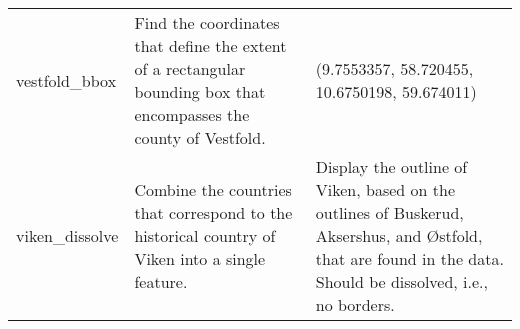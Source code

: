 \begin{longtable}{p{4cm}p{4.5cm}p{4.5cm}}
    vestfold\_bbox             & Find the coordinates that define the extent of a rectangular bounding box that encompasses the county of Vestfold.              & (9.7553357, 58.720455, 10.6750198, 59.674011)                                                                                                               \\
    viken\_dissolve            & Combine the countries that correspond to the historical country of Viken into a single feature.                                 & Display the outline of Viken, based on the outlines of Buskerud, Aksershus, and Østfold, that are found in the data. Should be dissolved, i.e., no borders. \\
\end{longtable}
